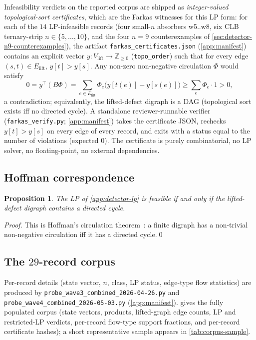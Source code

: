 \documentclass[11pt,a4paper]{article}
\theoremstyle{plain}
\newtheorem{proposition}[theorem]{Proposition}
\theoremstyle{definition}
\begin{document}
Infeasibility verdicts on the reported corpus are shipped as
\emph{integer-valued topological-sort certificates}, which are the
Farkas witnesses for this LP form: for each of the $14$ LP-infeasible
records (four small-$n$ absorbers w5..w8, six CLB ternary-strip
$n \in \{5, \ldots, 10\}$, and the four $n = 9$ counterexamples of
\cref{sec:detector-n9-counterexamples}), the artifact
\texttt{farkas\_certificates.json} (\cref{app:manifest}) contains
an explicit vector
$y : V_{\mathrm{lift}} \to \mathbb{Z}_{\ge 0}$ (\texttt{topo\_order})
such that for every edge $(s, t) \in E_{\mathrm{lift}}$,
$y[t] > y[s]$.  Any non-zero non-negative circulation $\Phi$ would
satisfy
\[
   0 = y^\top (B \Phi) = \sum_{e \in E_{\mathrm{lift}}} \Phi_e \bigl(y[t(e)] - y[s(e)]\bigr)
     \ge \sum_e \Phi_e \cdot 1 > 0,
\]
a contradiction; equivalently, the lifted-defect digraph is a DAG
(topological sort exists iff no directed cycle).  A standalone
reviewer-runnable verifier (\texttt{farkas\_verify.py};
\cref{app:manifest}) takes the certificate JSON, rechecks $y[t]
> y[s]$ on every edge of every record, and exits
with a status equal to the number of violations (expected $0$).
The certificate is purely combinatorial, no LP solver, no
floating-point, no external dependencies.

\subsection{Hoffman correspondence}\label{app:detector-hoffman}

\begin{proposition}\label{prop:hoffman}
The LP of \cref{app:detector-lp} is feasible if and only if the
lifted-defect digraph contains a directed cycle.
\end{proposition}
\begin{proof}
This is Hoffman's circulation theorem~\cite{Hoffman1960}: a finite
digraph has a non-trivial non-negative circulation iff it has a
directed cycle.\qed
\end{proof}

\subsection{The $29$-record corpus}\label{app:detector-corpus}

Per-record details (state vector, $n$, class, LP status, edge-type
flow statistics) are produced by
\texttt{probe\_wave3\_combined\_2026-04-26.py} and
\texttt{probe\_wave4\_combined\_2026-05-03.py}
(\cref{app:manifest}).
 gives the fully populated corpus (state
vectors, products, lifted-graph edge counts, LP and restricted-LP
verdicts, per-record flow-type support fractions, and per-record
certificate hashes); a short representative sample appears in
\cref{tab:corpus-sample}.
\end{document}
